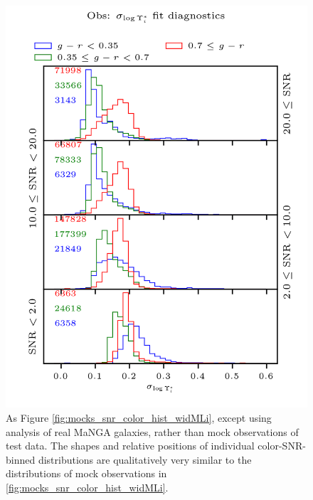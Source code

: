 \begin{figure}
\begin{minipage}[t]{\columnwidth}
        \centering
        \includegraphics[width=5in]{obs_snr_color_hist_widMLi}
        \caption[ versus color and signal-to-noise for observations]{As Figure \ref{fig:mocks_snr_color_hist_widMLi}, except using analysis of real MaNGA galaxies, rather than mock observations of test data. The shapes and relative positions of individual color-SNR-binned distributions are qualitatively very similar to the distributions of mock observations in \ref{fig:mocks_snr_color_hist_widMLi}.}
        \label{fig:obs_snr_color_hist_widMLi}
    \end{minipage}
    
\end{figure}

